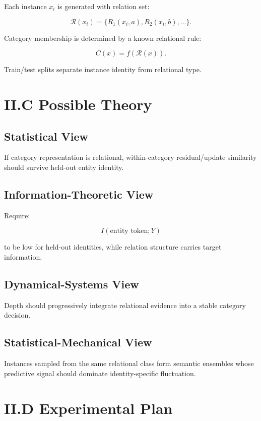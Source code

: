 \documentclass[10pt]{article}
\begin{document}
Each instance \(x_i\) is generated with relation set:

\[
\mathcal R(x_i)
=
\{R_1(x_i,a),R_2(x_i,b),\ldots\}.
\]

Category membership is determined by a known relational rule:

\[
C(x)=f(\mathcal R(x)).
\]

Train/test splits separate instance identity from relational type.

\section{II.C Possible Theory}

\subsection{Statistical View}

If category representation is relational, within-category residual/update similarity should survive held-out entity identity.

\subsection{Information-Theoretic View}

Require:

\[
I(\text{entity token};Y)
\]

to be low for held-out identities, while relation structure carries target information.

\subsection{Dynamical-Systems View}

Depth should progressively integrate relational evidence into a stable category decision.

\subsection{Statistical-Mechanical View}

Instances sampled from the same relational class form semantic ensembles whose predictive signal should dominate identity-specific fluctuation.

\section{II.D Experimental Plan}
\end{document}
